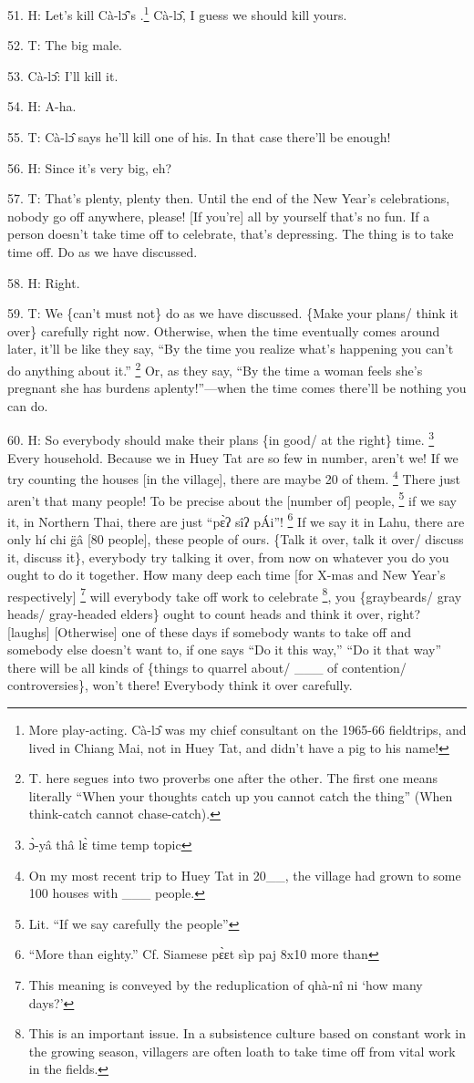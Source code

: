 51. H: Let's kill Cà-lɔ̂'s .\footnote{More play-acting.  Cà-lɔ̂ was my chief consultant on the 1965-66 fieldtrips, and lived in Chiang Mai, not in Huey Tat, and didn't have a pig to his name!} Cà-lɔ̂, I guess we should kill yours.

52. T: The big male.

53. Cà-lɔ̂: I'll kill it.

54. H: A-ha.

55. T: Cà-lɔ̂ says he'll kill one of his.  In that case there'll be enough!

56. H: Since it's very big, eh?

57. T: That's plenty, plenty then.  Until the end of the New Year's celebrations,
nobody go off anywhere, please!  [If you're] all by yourself that's no fun.  If
a person doesn't take time off to celebrate, that's depressing.  The thing is to
take time off.  Do as we have discussed.

58. H: Right.

59. T: We \{can't must not\} do as we have discussed.  \{Make your plans/ think
it over\} carefully right now.  Otherwise, when the time eventually comes around
later, it'll be like they say, ``By the time you realize what's happening you can't
do anything about it.'' \footnote{T. here segues into two proverbs one after the other.  The first one means literally ``When your thoughts catch up you cannot catch the thing'' (When think-catch cannot chase-catch).} Or, as they say, ``By the time a woman feels she's
pregnant she has burdens aplenty!''---when the time comes there'll be nothing you
can do.

60. H: So everybody should make their plans \{in good/ at the right\} time. \footnote{ɔ̀-yâ thâ lɛ̀  time temp topic}
Every household.  Because we in Huey Tat are so few in number, aren't we!  If
we try counting the houses [in the village], there are maybe 20 of them. \footnote{On my most recent trip to Huey Tat in 20\_\_, the village had grown to some 100 houses with \_\_\_ people.} There
just aren't that many people!  To be precise about the [number of] people, \footnote{Lit. ``If we say carefully the people''}
if we say it, in Northern Thai, there are just ``pɛ̀ʔ sîʔ pÁi''! \footnote{``More than eighty.'' Cf. Siamese pɛ̀ɛt sìp paj  8x10  more than} If
we say it in Lahu, there are only hí chi g̈â [80 people], these people of ours.
\{Talk it over, talk it over/ discuss it, discuss it\}, everybody try talking
it over, from now on whatever you do you ought to do it together.  How many deep
each time [for X-mas and New Year's respectively] \footnote{This meaning is conveyed by the reduplication of qhà-nî ni `how many days?'} will everybody take off
work to celebrate \footnote{This is an important issue.  In a subsistence culture based on constant work in the growing season, villagers are often loath to take time off from vital work in the fields.}, you \{graybeards/ gray heads/ gray-headed elders\} ought
to count heads and think it over, right? [laughs] [Otherwise] one of these days
if somebody wants to take off and somebody else doesn't want to, if one says ``Do
it this way,'' ``Do it that way'' there will be all kinds of \{things to quarrel
about/ \_\_\_ of contention/ controversies\}, won't there!  Everybody think it
over carefully.

